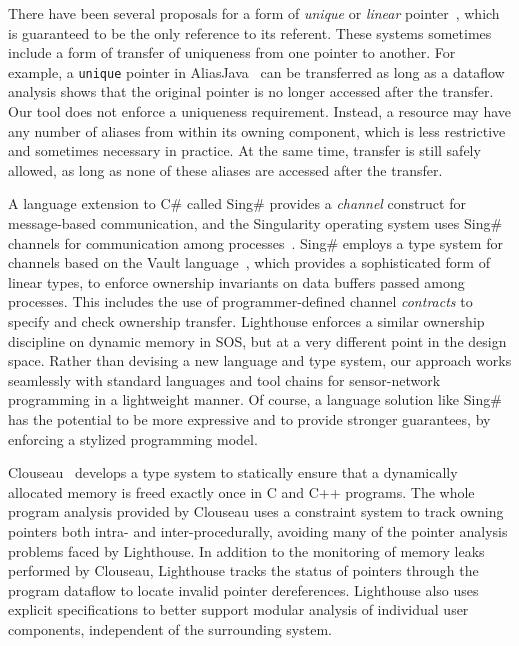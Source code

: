 There have been several proposals for a form of {\em unique} or {\em linear}
pointer~\cite{Boyland:2001:ABU,aliasjava,Wad90:linear}, which is guaranteed
to be the only reference to its referent.  
%
These systems sometimes include a form of transfer of uniqueness from one
pointer to another.
%
For example, a {\tt unique} pointer in AliasJava~\cite{aliasjava} can be
transferred as long as a dataflow analysis shows that the original pointer
is no longer accessed after the transfer.  
%
Our tool does not enforce a uniqueness requirement.
%
Instead, a resource may have any number of aliases from within its owning
component, which is less restrictive and sometimes necessary in practice.
%
%  
At the same time, transfer is still safely allowed, as long as none of these
aliases are accessed after the transfer.



A language extension to C\# called Sing\# provides a {\em channel} construct
for message-based communication, and the Singularity operating system uses
Sing\# channels for communication among
processes~\cite{fahndrich06language}.  
%
Sing\# employs a type system for channels based on the Vault
language~\cite{Vault,adoption-focus}, which provides a sophisticated form of
linear types, to enforce ownership invariants on data buffers passed among
processes.  
%
This includes the use of programmer-defined channel {\em contracts} to
specify and check ownership transfer.
%
Lighthouse enforces a similar ownership discipline on dynamic memory in SOS,
but at a very different point in the design space.  
%
Rather than devising a new language and type system, our approach works
seamlessly with standard languages and tool chains for sensor-network
programming in a lightweight manner.  
%
Of course, a language solution like Sing\# has the potential to be more
expressive and to provide stronger guarantees, by enforcing a stylized
programming model.



Clouseau~\cite{heine03practical} develops a type system to statically ensure
that a dynamically allocated memory is freed exactly once in C and C++
programs.
%
The whole program analysis provided by Clouseau uses a constraint system to
track owning pointers both intra- and inter-procedurally, avoiding many of
the pointer analysis problems faced by Lighthouse.
%
In addition to the monitoring of memory leaks performed by Clouseau,
Lighthouse tracks the status of pointers through the program dataflow to
locate invalid pointer dereferences.
%
Lighthouse also uses explicit specifications to better support modular
analysis of individual user components, independent of the surrounding
system.

